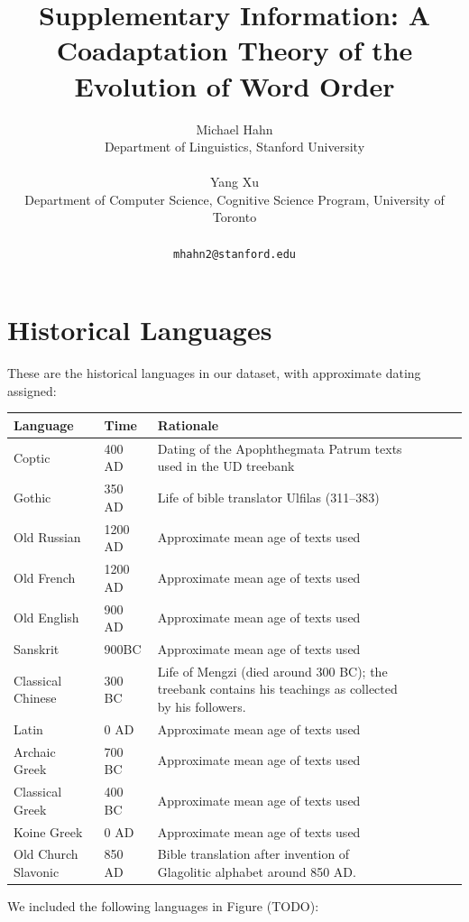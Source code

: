\documentclass[11pt,a4paper]{article}
\title{Supplementary Information: A Coadaptation Theory of the Evolution of Word Order}
\author{Michael Hahn\\Department of Linguistics, Stanford University\\\\Yang Xu\\ Department of Computer Science, Cognitive Science Program, University of Toronto\\\\ \texttt{mhahn2@stanford.edu}}
\date{}
\begin{document}
\maketitle

\tableofcontents

\section{Historical Languages}

These are the historical languages in our dataset, with approximate dating assigned:


\begin{tabular}{llp{10cm}llll}
Language & Time & Rationale \\ \hline
Coptic & 400 AD & Dating of the Apophthegmata Patrum texts used in the UD treebank\\
Gothic & 350 AD & Life of bible translator Ulfilas (311--383)\\
Old Russian & 1200 AD & Approximate mean age of texts used\\
Old French & 1200 AD  & Approximate mean age of texts used\\
Old English & 900 AD & Approximate mean age of texts used \\
Sanskrit & 900BC & Approximate mean age of texts used \\
Classical Chinese & 300 BC & Life of Mengzi (died around 300 BC); the treebank contains his teachings as collected by his followers. \\
Latin & 0 AD & Approximate mean age of texts used \\
Archaic Greek & 700 BC & Approximate mean age of texts used \\
Classical Greek & 400 BC & Approximate mean age of texts used \\
Koine Greek & 0 AD  & Approximate mean age of texts used\\
Old Church Slavonic & 850 AD &  Bible translation after invention of Glagolitic alphabet around 850 AD. \\
\end{tabular}



We included the following languages in Figure (TODO):
\end{document}
